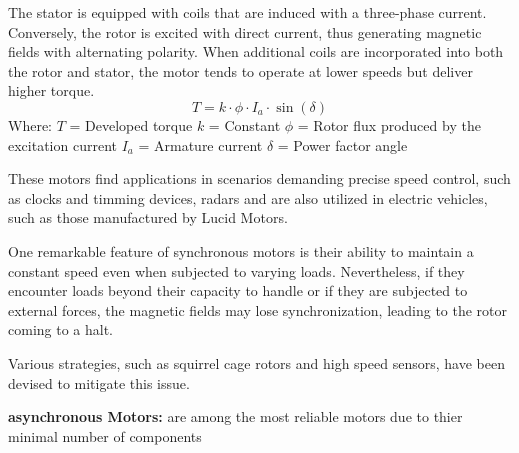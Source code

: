 \documentclass{article}
\begin{document}
\begin{flushleft}
The stator is equipped with coils that are induced with a three-phase current. Conversely, the rotor is excited with direct current, thus generating magnetic fields with alternating polarity. When additional coils are incorporated into both the rotor and stator, the motor tends to operate at lower speeds but deliver higher torque. \newline
\[
T = k \cdot \phi \cdot I_a \cdot \sin(\delta)
\]
Where:
\(T\) = Developed torque
\(k\) = Constant
\(\phi\) = Rotor flux produced by the excitation current
\(I_a\) = Armature current
\(\delta\) = Power factor angle

These motors find applications in scenarios demanding precise speed control, such as clocks and timming devices, radars and are also utilized in electric vehicles, such as those manufactured by Lucid Motors. \newline

One remarkable feature of synchronous motors is their ability to maintain a constant speed even when subjected to varying loads. Nevertheless, if they encounter loads beyond their capacity to handle or if they are subjected to external forces, the magnetic fields may lose synchronization, leading to the rotor coming to a halt. \newline

Various strategies, such as squirrel cage rotors and high speed sensors, have been devised to mitigate this issue.\newline

\textbf{asynchronous Motors:} are among the most reliable motors due to thier minimal number of components

\vspace*{3pt}




\end{flushleft}
\end{document}
